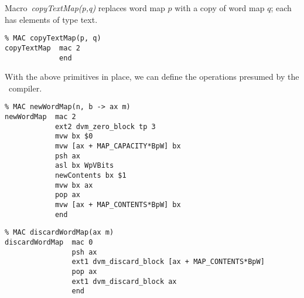 Macro~\emph{copyTextMap(p,q)} replaces word map $p$ with a copy of word map $q$; each has elements of type text.
\begin{tabbing}
\indents
{}
\fin
\end{tabbing}

{\small
\begin{verbatim}
% MAC copyTextMap(p, q)
copyTextMap  mac 2
             end
\end{verbatim}}

With the above primitives in place, we can define the operations presumed by the \jit\ compiler.

\begin{tabbing}
\indents
{}
\fin
\end{tabbing}

{\small
\begin{verbatim}
% MAC newWordMap(n, b -> ax m)
newWordMap  mac 2
            ext2 dvm_zero_block tp 3
            mvw bx $0
            mvw [ax + MAP_CAPACITY*BpW] bx
            psh ax
            asl bx WpVBits
            newContents bx $1
            mvw bx ax
            pop ax
            mvw [ax + MAP_CONTENTS*BpW] bx
            end
\end{verbatim}}

\begin{tabbing}
\indents
{}
\fin
\end{tabbing}

{\small
\begin{verbatim}
% MAC discardWordMap(ax m)
discardWordMap  mac 0
                psh ax
                ext1 dvm_discard_block [ax + MAP_CONTENTS*BpW]
                pop ax
                ext1 dvm_discard_block ax
                end
\end{verbatim}}

\begin{tabbing}
\indents
{}
\fin
\end{tabbing}

